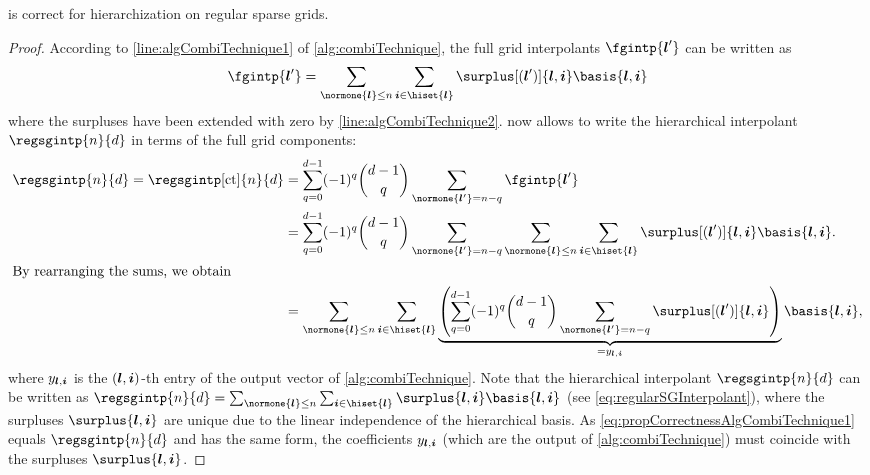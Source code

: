 \begin{proposition}
  \label{prop:correctnessAlgCombiTechnique}
  is correct for hierarchization on regular sparse grids.
\end{proposition}

\begin{proof}
  According to \cref{line:algCombiTechnique1} of \cref{alg:combiTechnique},
  the full grid interpolants $\fgintp{\*l'}$ can be written as
  \begin{equation}
    \fgintp{\*l'}
    = \sum_{\normone{\*l} \le n} \sum_{\*i \in \hiset{\*l}}
    \surplus[(\*l')]{\*l,\*i} \basis{\*l,\*i}
  \end{equation}
  where the surpluses have been extended with zero by
  \cref{line:algCombiTechnique2}.
   now allows to write the hierarchical
  interpolant $\regsgintp{n}{d}$ in terms of the full grid components:
  \begin{subequations}
    \begin{align}
      \regsgintp{n}{d}
      = \regsgintp[\ct]{n}{d}
      &= \sum_{q=0}^{d-1} (-1)^q \binom{d-1}{q} \sum_{\normone{\*l'} = n-q}
      \fgintp{\*l'}\\
      &= \sum_{q=0}^{d-1} (-1)^q \binom{d-1}{q} \sum_{\normone{\*l'} = n-q}
      \sum_{\normone{\*l} \le n} \sum_{\*i \in \hiset{\*l}}
      \surplus[(\*l')]{\*l,\*i} \basis{\*l,\*i}.\\
      \intertext{%
        By rearranging the sums, we obtain%
      }
      \label{eq:propCorrectnessAlgCombiTechnique1}
      &= \sum_{\normone{\*l} \le n} \sum_{\*i \in \hiset{\*l}}
      \underbrace{
        \left(\sum_{q=0}^{d-1} (-1)^q \binom{d-1}{q} \sum_{\normone{\*l'} = n-q}
        \surplus[(\*l')]{\*l,\*i}\right)
      }_{= \linout{\*l,\*i}}
      \basis{\*l,\*i},
    \end{align}
  \end{subequations}
  where $\linout{\*l,\*i}$ is the $({\boldsymbol{l}},{\boldsymbol{i}})$-th entry of the output vector
  of \cref{alg:combiTechnique}.
  Note that the hierarchical interpolant $\regsgintp{n}{d}$
  can be written as
  $\regsgintp{n}{d} = \sum_{\normone{\*l} \le n} \sum_{\*i \in \hiset{\*l}}
  \surplus{\*l,\*i} \basis{\*l,\*i}$
  (see \eqref{eq:regularSGInterpolant}),
  where the surpluses $\surplus{\*l,\*i}$ are unique due to the
  linear independence of the hierarchical basis.
  As \eqref{eq:propCorrectnessAlgCombiTechnique1}
  equals $\regsgintp{n}{d}$ and has the same form,
  the coefficients $\linout{\*l,\*i}$
  (which are the output of \cref{alg:combiTechnique})
  must coincide with the surpluses $\surplus{\*l,\*i}$.
\end{proof}



